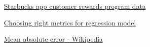 \documentclass[a4paper,12pt]{article}
\begin{document}
\begin{thebibliography}{4}

    \href{https://www.kaggle.com/datasets/blacktile/starbucks-app-customer-reward-program-data}
    {Starbucks app customer rewards program data}

    \href{https://stackoverflow.com/questions/60869083/choosing-right-metrics-for-regression-model}
    {Choosing right metrics for regression model}

    \href{https://en.wikipedia.org/wiki/Mean_absolute_error}{Mean absolute error - Wikipedia}

\end{thebibliography}
\end{document}
